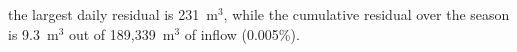 the largest daily residual is 231~m$^3$, while the cumulative residual over the season is 9.3~m$^3$ out of 189{,}339~m$^3$ of inflow (0.005\%).
